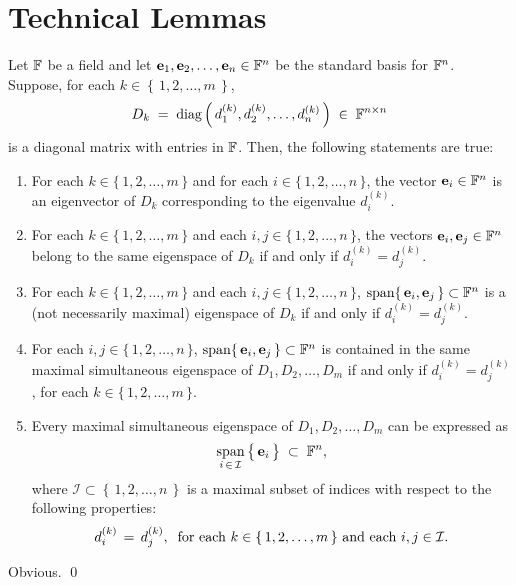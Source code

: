 

\section{Technical Lemmas}
\setcounter{theorem}{0}
\setcounter{equation}{0}

\renewcommand{\theenumi}{\roman{enumi}}
\renewcommand{\labelenumi}{\textnormal{(\theenumi)}$\;\;$}

\begin{lemma}
\label{simultaneousESpace}
\mbox{}\vskip 0.05cm
\noindent
Let $\mathbb{F}$ be a field and
let $\mathbf{e}_{1}, \mathbf{e}_{2}, \ldots, \mathbf{e}_{n} \in \mathbb{F}^{n}$ be the standard basis for $\mathbb{F}^{n}$.
Suppose, for each $k \in \left\{\,1,2,\ldots,m\,\right\}$,
\begin{equation*}
D_{k} \; = \; \textnormal{diag}\left(\,d^{(k)}_{1},d^{(k)}_{2},\ldots,d^{(k)}_{n}\,\right) \;\in\; \mathbb{F}^{n \times n}
\end{equation*}
is a diagonal matrix with entries in $\mathbb{F}$.
Then, the following statements are true:
\begin{enumerate}
\item
	For each $k \in\{\,1, 2, \ldots, m\,\}$ and for each $i \in \{\,1,2,\ldots,n\,\}$,
	the vector $\mathbf{e}_{i} \in \mathbb{F}^{n}$ is an eigenvector of $D_{k}$
	corresponding to the eigenvalue $d^{(k)}_{i}$.
\item
	For each $k \in\{\,1, 2, \ldots, m\,\}$ and each $i,j \in \{\,1,2,\ldots,n\,\}$,
	the vectors $\mathbf{e}_{i}, \mathbf{e}_{j} \in \mathbb{F}^{n}$ belong to the same eigenspace
	of $D_{k}$ if and only if $d^{(k)}_{i} = d^{(k)}_{j}$.
\item
	For each $k \in\{\,1, 2, \ldots, m\,\}$ and each $i,j \in \{\,1,2,\ldots,n\,\}$,
	$\textnormal{span}\!\left\{\,\mathbf{e}_{i}, \mathbf{e}_{j}\,\right\} \subset \mathbb{F}^{n}$
	is a (not necessarily maximal) eigenspace of $D_{k}$ if and only if $d^{(k)}_{i} = d^{(k)}_{j}$.
\item
	For each $i,j \in \{\,1,2,\ldots,n\,\}$, 
	$\textnormal{span}\!\left\{\,\mathbf{e}_{i}, \mathbf{e}_{j}\,\right\} \subset \mathbb{F}^{n}$
	is contained in the same maximal simultaneous eigenspace of
	$D_{1}, D_{2}, \ldots, D_{m}$
	if and only if $d^{(k)}_{i} = d^{(k)}_{j}$, for each $k \in \{\,1,2,\ldots,m\,\}$.
\item
	Every maximal simultaneous eigenspace of $D_{1}, D_{2}, \ldots, D_{m}$
	can be expressed as
	\begin{equation*}
	\underset{i\,\in\,\mathcal{I}}{\span}\left\{\,\overset{{\color{white}.}}{\mathbf{e}}_{i}\,\right\}
	\;\subset\;\F^{n},
	\end{equation*}
	where $\mathcal{I} \subset \left\{\,1,2,\ldots,n\,\right\}$ is a maximal subset of indices
	with respect to the following properties:
	\begin{equation*}
	d^{(k)}_{i} \,=\, d^{(k)}_{j},
	\;\;
	\textnormal{for each $k \in \left\{\,1,2,\ldots,m\,\right\}$ and each $i,j \in \mathcal{I}$}.
	\end{equation*}
\end{enumerate}
\end{lemma}
\proof Obvious. \qed

